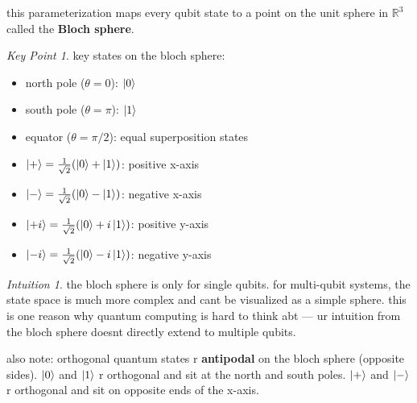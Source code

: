 \documentclass[11pt,a4paper]{article}
\theoremstyle{definition}
\theoremstyle{remark}
\newtheorem*{intuition}{Intuition}
\newtheorem*{keypoint}{Key Point}
\begin{document}
this parameterization maps every qubit state to a point on the unit sphere in $\mathbb{R}^3$ called the \textbf{Bloch sphere}.

\begin{center}
\end{center}

\begin{keypoint}
key states on the bloch sphere:
\begin{itemize}
    \item north pole ($\theta = 0$): $\ket{0}$
    \item south pole ($\theta = \pi$): $\ket{1}$
    \item equator ($\theta = \pi/2$): equal superposition states
    \item $\ket{+} = \frac{1}{\sqrt{2}}(\ket{0} + \ket{1})$: positive x-axis
    \item $\ket{-} = \frac{1}{\sqrt{2}}(\ket{0} - \ket{1})$: negative x-axis
    \item $\ket{+i} = \frac{1}{\sqrt{2}}(\ket{0} + i\ket{1})$: positive y-axis
    \item $\ket{-i} = \frac{1}{\sqrt{2}}(\ket{0} - i\ket{1})$: negative y-axis
\end{itemize}
\end{keypoint}

\begin{intuition}
the bloch sphere is only for single qubits. for multi-qubit systems, the state space is much more complex and cant be visualized as a simple sphere. this is one reason why quantum computing is hard to think abt --- ur intuition from the bloch sphere doesnt directly extend to multiple qubits.

also note: orthogonal quantum states r \textbf{antipodal} on the bloch sphere (opposite sides). $\ket{0}$ and $\ket{1}$ r orthogonal and sit at the north and south poles. $\ket{+}$ and $\ket{-}$ r orthogonal and sit on opposite ends of the x-axis.
\end{intuition}
\end{document}
